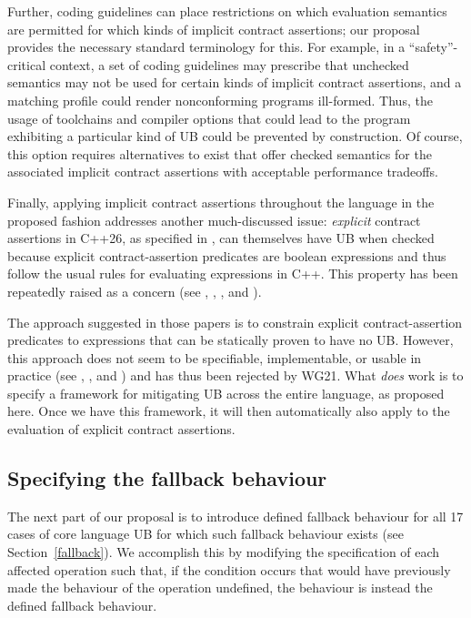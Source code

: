 Further, coding guidelines can place restrictions on which evaluation semantics are permitted for which kinds of implicit contract assertions; our proposal provides the necessary standard terminology for this. For example, in a ``safety''-critical context, a set of coding guidelines may prescribe that unchecked semantics may not be used for certain kinds of implicit contract assertions, and a matching profile could render nonconforming programs ill-formed. Thus, the usage of toolchains and compiler options that could lead to the program exhibiting a particular kind of UB could be prevented by construction. Of course, this option requires alternatives to exist that offer checked semantics for the associated implicit contract assertions with acceptable performance tradeoffs.

Finally, applying implicit contract assertions throughout the language in the proposed fashion addresses another much-discussed issue: \emph{explicit} contract assertions in C++26, as specified in \cite{P2900R14}, can themselves have UB when checked because explicit contract-assertion predicates are boolean expressions and thus follow the usual rules for evaluating expressions in C++. This property has been repeatedly raised as a concern (see \cite{P2680R1}, \cite{P3173R0}, \cite{P3285R0}, and \cite{P3362R0}).

The approach suggested in those papers is to constrain explicit contract-assertion predicates to expressions that can be statically proven to have no UB. However, this approach does not seem to be specifiable, implementable, or usable in practice (see  \cite{P3376R0}, \cite{P3386R0}, and \cite{P3499R1}) and has thus been rejected by WG21. What \emph{does} work is to specify a framework for mitigating UB across the entire language, as proposed here. Once we have this framework, it will then automatically also apply to the evaluation of explicit contract assertions.

\subsection{Specifying the fallback behaviour}
\label{specifyfallback}

The next part of our proposal is to introduce defined fallback behaviour for all 17 cases of core language UB for which such fallback behaviour exists (see Section~\ref{fallback}). We accomplish this by modifying the specification of each affected operation such that, if the condition occurs that would have previously made the behaviour of the operation undefined, the behaviour is instead the defined fallback behaviour.

